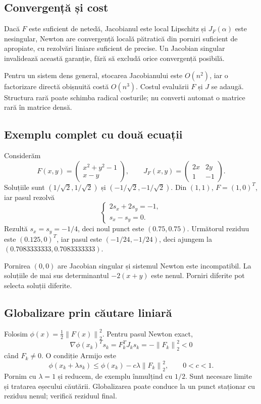 \documentclass[11pt,a4paper]{article}
\newcommand{\norm}[1]{\left\lVert#1\right\rVert}
\begin{document}
\subsection{Convergență și cost}
Dacă $F$ este suficient de netedă, Jacobianul este local Lipschitz și $J_F(\alpha)$ este nesingular, Newton are convergență locală pătratică din porniri suficient de apropiate, cu rezolvări liniare suficient de precise. Un Jacobian singular invalidează această garanție, fără să excludă orice convergență posibilă.

Pentru un sistem dens general, stocarea Jacobianului este $O(n^2)$, iar o factorizare directă obișnuită costă $O(n^3)$. Costul evaluării $F$ și $J$ se adaugă. Structura rară poate schimba radical costurile; nu converti automat o matrice rară în matrice densă.

\subsection{Exemplu complet cu două ecuații}
Considerăm
\[
F(x,y)=\begin{pmatrix}x^2+y^2-1\\x-y\end{pmatrix},\qquad
J_F(x,y)=\begin{pmatrix}2x&2y\\1&-1\end{pmatrix}.
\]
Soluțiile sunt $(1/\sqrt2,1/\sqrt2)$ și $(-1/\sqrt2,-1/\sqrt2)$. Din $(1,1)$, $F=(1,0)^T$, iar pasul rezolvă
\[
\begin{cases}2s_x+2s_y=-1,\\s_x-s_y=0.\end{cases}
\]
Rezultă $s_x=s_y=-1/4$, deci noul punct este $(0.75,0.75)$. Următorul reziduu este $(0.125,0)^T$, iar pasul este $(-1/24,-1/24)$, deci ajungem la $(0.7083333333,0.7083333333)$.

Pornirea $(0,0)$ are Jacobian singular și sistemul Newton este incompatibil. La soluțiile de mai sus determinantul $-2(x+y)$ este nenul. Porniri diferite pot selecta soluții diferite.

\subsection{Globalizare prin căutare liniară}
Folosim $\phi(x)=\tfrac12\norm{F(x)}_2^2$. Pentru pasul Newton exact,
\[
\nabla\phi(x_k)^Ts_k=F_k^TJ_ks_k=-\norm{F_k}_2^2<0
\]
când $F_k\ne0$. O condiție Armijo este
\[
\phi(x_k+\lambda s_k)\le\phi(x_k)-c\lambda\norm{F_k}_2^2,
\qquad 0<c<1.
\]
Pornim cu $\lambda=1$ și reducem, de exemplu înmulțind cu $1/2$. Sunt necesare limite și tratarea eșecului căutării. Globalizarea poate conduce la un punct staționar cu reziduu nenul; verifică reziduul final.
\end{document}
